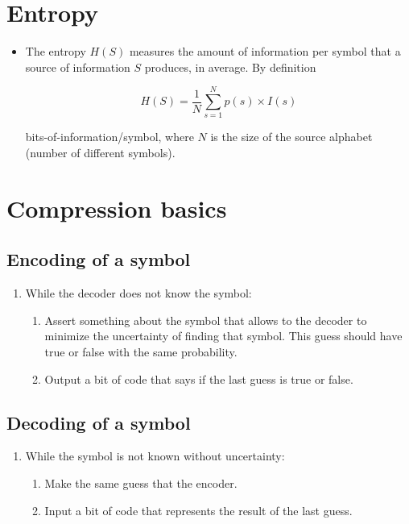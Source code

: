 
\section{Entropy}
\begin{itemize}
\item
  The entropy \(H(S)\) measures the amount of information per symbol
  that a source of information \(S\) produces, in average. By definition

  \begin{equation}
    H(S) = \frac{1}{N}\sum_{s=1}^{N} p(s)\times I(s)
  \end{equation}

  bits-of-information/symbol, where \(N\) is the size of the source
  alphabet (number of different symbols).
\end{itemize}

\section{Compression basics}

\subsection{Encoding of a symbol}
\begin{enumerate}
\def\labelenumi{\arabic{enumi}.}
\tightlist
\item
  While the decoder does not know the symbol:

  \begin{enumerate}
  \def\labelenumii{\arabic{enumii}.}
  \tightlist
  \item
    Assert something about the symbol that allows to the decoder to
    minimize the uncertainty of finding that symbol. This guess should
    have true or false with the same probability.
  \item
    Output a bit of code that says if the last guess is true or false.
  \end{enumerate}
\end{enumerate}

\subsection{Decoding of a symbol}
\begin{enumerate}
\def\labelenumi{\arabic{enumi}.}
\tightlist
\item
  While the symbol is not known without uncertainty:

  \begin{enumerate}
  \def\labelenumii{\arabic{enumii}.}
  \tightlist
  \item
    Make the same guess that the encoder.
  \item
    Input a bit of code that represents the result of the last guess.
  \end{enumerate}
\end{enumerate}

